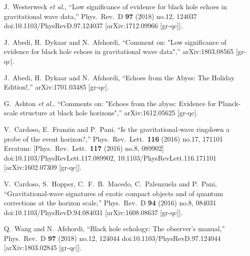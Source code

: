 \documentclass[a4paper,11pt]{article}
\begin{document}
\begin{thebibliography}{99}
  J.~Westerweck {\it et al.},
  ``Low significance of evidence for black hole echoes in gravitational wave data,''
  Phys.\ Rev.\ D {\bf 97} (2018) no.12,  124037
  doi:10.1103/PhysRevD.97.124037
  [arXiv:1712.09966 [gr-qc]].

  J.~Abedi, H.~Dykaar and N.~Afshordi,
  ``Comment on: "Low significance of evidence for black hole echoes in gravitational wave data",''
  arXiv:1803.08565 [gr-qc].
  
  J.~Abedi, H.~Dykaar and N.~Afshordi,
  ``Echoes from the Abyss: The Holiday Edition!,''
  arXiv:1701.03485 [gr-qc].
  
  G.~Ashton {\it et al.},
  ``Comments on: "Echoes from the abyss: Evidence for Planck-scale structure at black hole horizons",''
  arXiv:1612.05625 [gr-qc].
  
  V.~Cardoso, E.~Franzin and P.~Pani,
  ``Is the gravitational-wave ringdown a probe of the event horizon?,''
  Phys.\ Rev.\ Lett.\  {\bf 116} (2016) no.17,  171101
   Erratum: [Phys.\ Rev.\ Lett.\  {\bf 117} (2016) no.8,  089902]
  doi:10.1103/PhysRevLett.117.089902, 10.1103/PhysRevLett.116.171101
  [arXiv:1602.07309 [gr-qc]].

  V.~Cardoso, S.~Hopper, C.~F.~B.~Macedo, C.~Palenzuela and P.~Pani,
  ``Gravitational-wave signatures of exotic compact objects and of quantum corrections at the horizon scale,''
  Phys.\ Rev.\ D {\bf 94} (2016) no.8,  084031
  doi:10.1103/PhysRevD.94.084031
  [arXiv:1608.08637 [gr-qc]].
  
  Q.~Wang and N.~Afshordi,
  ``Black hole echology: The observer’s manual,''
  Phys.\ Rev.\ D {\bf 97} (2018) no.12,  124044
  doi:10.1103/PhysRevD.97.124044
  [arXiv:1803.02845 [gr-qc]].
 

\end{thebibliography}
\end{document}
